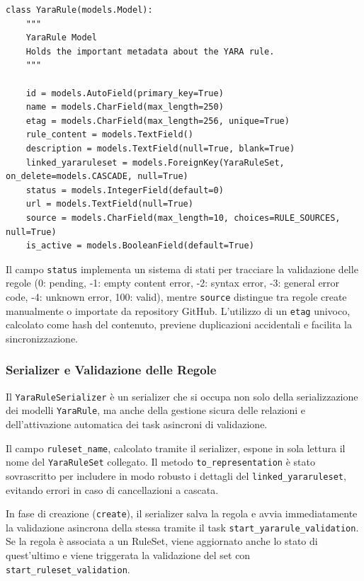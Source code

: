 \begin{verbatim}
class YaraRule(models.Model):
    """
    YaraRule Model
    Holds the important metadata about the YARA rule.
    """

    id = models.AutoField(primary_key=True)
    name = models.CharField(max_length=250)
    etag = models.CharField(max_length=256, unique=True)
    rule_content = models.TextField()
    description = models.TextField(null=True, blank=True)
    linked_yararuleset = models.ForeignKey(YaraRuleSet, on_delete=models.CASCADE, null=True)
    status = models.IntegerField(default=0)
    url = models.TextField(null=True)
    source = models.CharField(max_length=10, choices=RULE_SOURCES, null=True)
    is_active = models.BooleanField(default=True)
\end{verbatim}

Il campo \texttt{status} implementa un sistema di stati per tracciare la validazione delle regole (0: pending, -1: empty content error, -2: syntax error, -3: general error code, -4: unknown error, 100: valid), mentre \texttt{source} distingue tra regole create manualmente o importate da repository GitHub. L'utilizzo di un \texttt{etag} univoco, calcolato come hash del contenuto, previene duplicazioni accidentali e facilita la sincronizzazione.

\subsubsection{Serializer e Validazione delle Regole}

Il \texttt{YaraRuleSerializer} è un serializer che si occupa non solo della serializzazione dei modelli \texttt{YaraRule}, ma anche della gestione sicura delle relazioni e dell'attivazione automatica dei task asincroni di validazione.

Il campo \texttt{ruleset\_name}, calcolato tramite il serializer, espone in sola lettura il nome del \texttt{YaraRuleSet} collegato. Il metodo \texttt{to\_representation} è stato sovrascritto per includere in modo robusto i dettagli del \texttt{linked\_yararuleset}, evitando errori in caso di cancellazioni a cascata.

In fase di creazione (\texttt{create}), il serializer salva la regola e avvia immediatamente la validazione asincrona della stessa tramite il task \texttt{start\_yararule\_validation}. Se la regola è associata a un RuleSet, viene aggiornato anche lo stato di quest’ultimo e viene triggerata la validazione del set con \texttt{start\_ruleset\_validation}.

